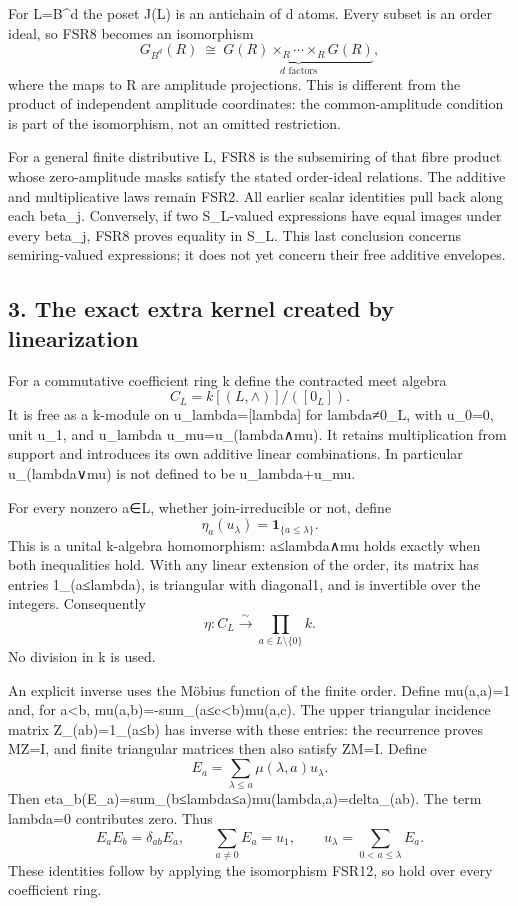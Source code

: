 \documentclass[
  10pt,
  a4paper,
]{article}
\begin{document}
For L=B\^{}d the poset J(L) is an antichain of d atoms. Every subset is
an order ideal, so FSR8 becomes an isomorphism \[
G_{B^d}(R)\ \cong\ \underbrace{G(R)\times_R\cdots\times_R G(R)}_{d\text{ factors}},
\tag{FSR9}
\] where the maps to R are amplitude projections. This is different from
the product of independent amplitude coordinates: the common-amplitude
condition is part of the isomorphism, not an omitted restriction.

For a general finite distributive L, FSR8 is the subsemiring of that
fibre product whose zero-amplitude masks satisfy the stated order-ideal
relations. The additive and multiplicative laws remain FSR2. All earlier
scalar identities pull back along each beta\_j. Conversely, if two
S\_L-valued expressions have equal images under every beta\_j, FSR8
proves equality in S\_L. This last conclusion concerns semiring-valued
expressions; it does not yet concern their free additive envelopes.

\subsection{3. The exact extra kernel created by
linearization}\label{the-exact-extra-kernel-created-by-linearization}

For a commutative coefficient ring k define the contracted meet algebra
\[
C_L=k[(L,\wedge)]/([0_L]).
\tag{FSR10}
\] It is free as a k-module on u\_lambda={[}lambda{]} for lambda≠0\_L,
with u\_0=0, unit u\_1, and u\_lambda u\_mu=u\_(lambda∧mu). It retains
multiplication from support and introduces its own additive linear
combinations. In particular u\_(lambda∨mu) is not defined to be
u\_lambda+u\_mu.

For every nonzero a∈L, whether join-irreducible or not, define \[
\eta_a(u_\lambda)=\mathbf1_{\{a\leq\lambda\}}.
\tag{FSR11}
\] This is a unital k-algebra homomorphism: a≤lambda∧mu holds exactly
when both inequalities hold. With any linear extension of the order, its
matrix has entries 1\_(a≤lambda), is triangular with diagonal1, and is
invertible over the integers. Consequently \[
\eta:C_L\xrightarrow{\sim}\prod_{a\in L\setminus\{0\}}k.
\tag{FSR12}
\] No division in k is used.

An explicit inverse uses the Möbius function of the finite order. Define
mu(a,a)=1 and, for a\textless b, mu(a,b)=-sum\_(a≤c\textless b)mu(a,c).
The upper triangular incidence matrix Z\_(ab)=1\_(a≤b) has inverse with
these entries: the recurrence proves MZ=I, and finite triangular
matrices then also satisfy ZM=I. Define \[
E_a=\sum_{\lambda\leq a}\mu(\lambda,a)u_\lambda.
\tag{FSR13}
\] Then eta\_b(E\_a)=sum\_(b≤lambda≤a)mu(lambda,a)=delta\_(ab). The term
lambda=0 contributes zero. Thus \[
E_aE_b=\delta_{ab}E_a,\qquad
\sum_{a\neq0}E_a=u_1,\qquad
u_\lambda=\sum_{0<a\leq\lambda}E_a.
\tag{FSR14}
\] These identities follow by applying the isomorphism FSR12, so hold
over every coefficient ring.
\end{document}
